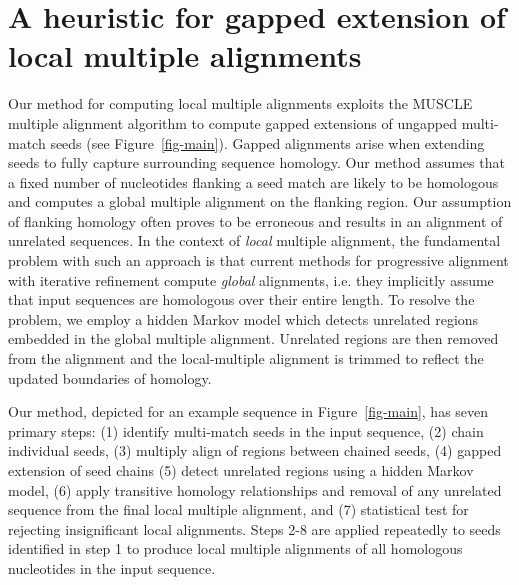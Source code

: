 \documentclass[9.5pt,journal,final,finalsubmission,twocolumn]{IEEEtran}
\begin{document}
\section{A heuristic for gapped extension of local multiple alignments}
Our method for computing local multiple alignments exploits the MUSCLE
multiple alignment algorithm to compute gapped extensions of ungapped
multi-match seeds (see Figure~\ref{fig-main}). Gapped alignments arise
when extending seeds to fully capture surrounding sequence
homology. Our method assumes that a fixed number of nucleotides
flanking a seed match are likely to be homologous and computes a
global multiple alignment on the flanking region.  Our assumption of
flanking homology often proves to be erroneous and results in an
alignment of unrelated sequences.  In the context of \textit{local}
multiple alignment, the fundamental problem with such an approach is
that current methods for progressive alignment with iterative
refinement compute \textit{global} alignments, i.e. they implicitly
assume that input sequences are homologous over their entire length.
To resolve the problem, we employ a hidden Markov model which detects
unrelated regions embedded in the global multiple alignment.
Unrelated regions are then removed from the alignment and the
local-multiple alignment is trimmed to reflect the updated boundaries
of homology.

Our method, depicted for an example sequence in
Figure~\ref{fig-main}, has seven primary steps: (1) identify
multi-match seeds in the input sequence, (2) chain individual
seeds, (3) multiply align of regions between chained seeds, (4)
gapped extension of seed chains (5) detect unrelated regions
using a hidden Markov model, (6) apply transitive homology
relationships and removal of any unrelated sequence from
the final local multiple alignment, and (7) statistical test for rejecting
insignificant local alignments.  Steps 2-8 are applied
repeatedly to seeds identified in step 1 to produce local multiple
alignments of all homologous nucleotides in the input sequence.
\end{document}
